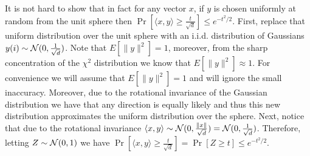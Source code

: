 \documentclass{article}
\begin{document}
It is not hard to show that in fact for any vector $x$, if $y$ is chosen uniformly at random from the unit sphere 
then $\Pr[ \langle x,y \rangle  \ge \frac{t}{\sqrt{d}}] \le e^{-t^2/2}$.
First, replace that uniform distribution over the unit sphere with an i.i.d. distribution of Gaussians $y(i)\sim {\mathcal{N}}(0,\frac{1}{\sqrt{d}})$.
Note that $E[\|y\|^2] = 1$, moreover, from the sharp concentration of the $\chi^2$ distribution we know that $E[\|y\|^2] \approx 1$.
For convenience we will assume that $E[\|y\|^2] = 1$ and will ignore the small inaccuracy.
Moreover, due to the rotational invariance of the Gaussian distribution we have that any direction is equally likely and thus this
new distribution approximates the uniform distribution over the sphere.
Next, notice that due to the rotational invariance $\langle x,y \rangle \sim {\mathcal{N}}(0,\frac{\|x\|}{\sqrt{d}}) = {\mathcal{N}}(0,\frac{1}{\sqrt{d}})$.
Therefore, letting $Z \sim {\mathcal{N}}(0,1)$ we have $\Pr[ \langle x,y \rangle  \ge \frac{t}{\sqrt{d}}] = \Pr[Z \ge t] \le e^{-t^2/2}$.





\end{document}
